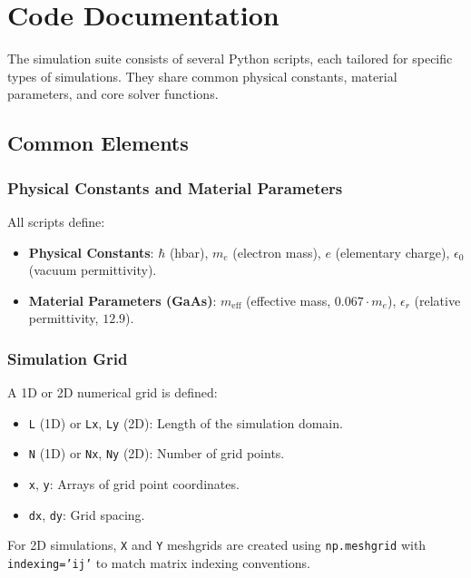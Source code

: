 \documentclass{article}
\begin{document}
\subsection{}

\section{Code Documentation}
The simulation suite consists of several Python scripts, each tailored for specific types of simulations. They share common physical constants, material parameters, and core solver functions.

\subsection{Common Elements}
\subsubsection{Physical Constants and Material Parameters}
All scripts define:
\begin{itemize}
	\item \textbf{Physical Constants}: $\hbar$ (hbar), $m_e$ (electron mass), $e$ (elementary charge), $\epsilon_0$ (vacuum permittivity).
	\item \textbf{Material Parameters (GaAs)}: $m_{\text{eff}}$ (effective mass, $0.067 \cdot m_e$), $\epsilon_r$ (relative permittivity, $12.9$).
\end{itemize}

\subsubsection{Simulation Grid}
A 1D or 2D numerical grid is defined:
\begin{itemize}
	\item \texttt{L} (1D) or \texttt{Lx}, \texttt{Ly} (2D): Length of the simulation domain.
	\item \texttt{N} (1D) or \texttt{Nx}, \texttt{Ny} (2D): Number of grid points.
	\item \texttt{x}, \texttt{y}: Arrays of grid point coordinates.
	\item \texttt{dx}, \texttt{dy}: Grid spacing.
\end{itemize}
For 2D simulations, \texttt{X} and \texttt{Y} meshgrids are created using \texttt{np.meshgrid} with \texttt{indexing='ij'} to match matrix indexing conventions.
\end{document}
